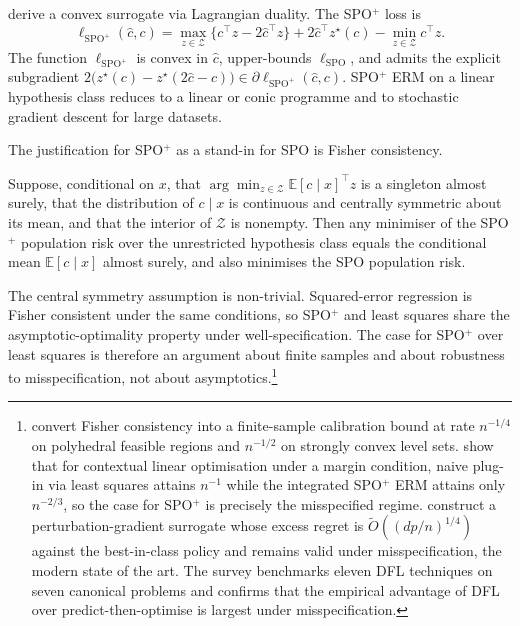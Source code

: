 \citet{ElmachtoubGrigas2022} derive a convex surrogate via Lagrangian
duality. The SPO$^+$ loss is
\begin{equation}
\ell_{\mathrm{SPO}^+}(\hat c, c)
= \max_{z \in \mathcal Z}\bigl\{ c^\top z - 2 \hat c^\top z \bigr\}
  + 2 \hat c^\top z^\star(c) - \min_{z \in \mathcal Z} c^\top z.
\label{eq:spo_plus_loss}
\end{equation}
The function $\ell_{\mathrm{SPO}^+}$ is convex in $\hat c$, upper-bounds
$\ell_{\mathrm{SPO}}$, and admits the explicit subgradient
$2\bigl(z^\star(c) - z^\star(2 \hat c - c)\bigr) \in
\partial \ell_{\mathrm{SPO}^+}(\hat c, c)$. SPO$^+$ ERM on a linear
hypothesis class reduces to a linear or conic programme and to stochastic
gradient descent for large datasets.

The justification for SPO$^+$ as a stand-in for SPO is Fisher consistency.

\begin{theorem}
\label{thm:spo_fisher}
Suppose, conditional on $x$, that $\arg\min_{z \in \mathcal Z} \mathbb
E[c \mid x]^\top z$ is a singleton almost surely, that the distribution of
$c \mid x$ is continuous and centrally symmetric about its mean, and that
the interior of $\mathcal Z$ is nonempty. Then any minimiser of the SPO$^+$
population risk over the unrestricted hypothesis class equals the
conditional mean $\mathbb E[c \mid x]$ almost surely, and also minimises
the SPO population risk.
\end{theorem}

The central symmetry assumption is non-trivial. Squared-error regression
is Fisher consistent under the same conditions, so SPO$^+$ and least
squares share the asymptotic-optimality property under
well-specification. The case for SPO$^+$ over least squares is therefore
an argument about finite samples and about robustness to misspecification,
not about asymptotics.\footnote{\citet{LiuGrigas2021} convert Fisher
consistency into a finite-sample calibration bound at rate $n^{-1/4}$ on
polyhedral feasible regions and $n^{-1/2}$ on strongly convex level sets.
\citet{HuKallus2020} show that for contextual linear optimisation under a
margin condition, naive plug-in via least squares attains $n^{-1}$ while
the integrated SPO$^+$ ERM attains only $n^{-2/3}$, so the case for
SPO$^+$ is precisely the misspecified regime. \citet{HuangGupta2024}
construct a perturbation-gradient surrogate whose excess regret is
$\widetilde O((dp/n)^{1/4})$ against the best-in-class policy and remains
valid under misspecification, the modern state of the art. The
\citet{Mandi2024} survey benchmarks eleven DFL techniques on seven
canonical problems and confirms that the empirical advantage of DFL over
predict-then-optimise is largest under misspecification.}

